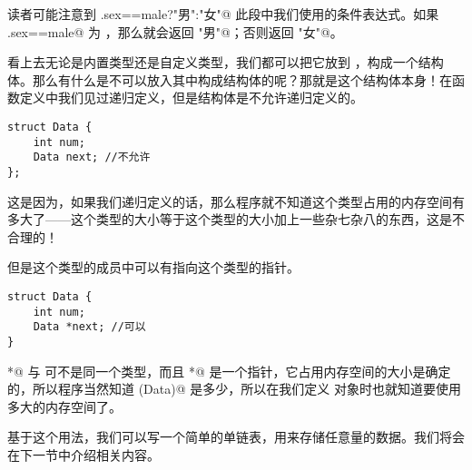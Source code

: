 读者可能注意到 \lstinline@person.sex==male?"男":"女"@ 此段中我们使用的条件表达式。如果 \lstinline@person.sex==male@ 为 \lstinline@true@，那么就会返回 \lstinline@"男"@；否则返回 \lstinline@"女"@。\par
看上去无论是内置类型还是自定义类型，我们都可以把它放到 ，构成一个结构体。那么有什么是不可以放入其中构成结构体的呢？那就是这个结构体本身！在函数定义中我们见过递归定义，但是结构体是不允许递归定义的。
\begin{lstlisting}
struct Data {
    int num;
    Data next; //不允许
};
\end{lstlisting}
这是因为，如果我们递归定义的话，那么程序就不知道这个类型占用的内存空间有多大了——这个类型的大小等于这个类型的大小加上一些杂七杂八的东西，这是不合理的！\par
但是这个类型的成员中可以有指向这个类型的指针。
\begin{lstlisting}
struct Data {
    int num;
    Data *next; //可以
}
\end{lstlisting}
\lstinline@Data*@ 与 \lstinline@Data@ 可不是同一个类型，而且 \lstinline@Data*@ 是一个指针，它占用内存空间的大小是确定的，所以程序当然知道 \lstinline@sizeof(Data)@ 是多少，所以在我们定义 \lstinline@Data@ 对象时也就知道要使用多大的内存空间了。\par
基于这个用法，我们可以写一个简单的单链表，用来存储任意量的数据。我们将会在下一节中介绍相关内容。\par
